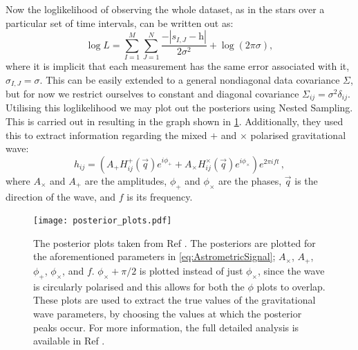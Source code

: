 Now the loglikelihood of observing the whole dataset, as in the stars over a particular set of time intervals, can be written out as:
%
\begin{equation}
    \log L = \sum^M_{I=1} \sum^N_{J=1} \frac{- | s_{I,J} - \mathbf{ \mathrm{h} }|}{2 \sigma^2}+\log (2\pi \sigma),
\end{equation}
%
where it is implicit that each measurement has the same error associated with it, $\sigma_{I,J}=\sigma$. This can be easily extended to a general nondiagonal data covariance $\Sigma$, but for now we restrict ourselves to constant and diagonal covariance $\Sigma_{ij}=\sigma^2 \delta_{ij}$. Utilising this loglikelihood we may plot out the posteriors using Nested Sampling. This is carried out in \cite{Mihaylov_2020} resulting in the graph shown in \cref{fig:lasenbyposteriors}. Additionally, they used this to extract information regarding the mixed $+$ and $\times$ polarised gravitational wave:
%
\begin{equation}\label{eq:AstrometricSignal} h_{ij}\!=\!\left(A_{+}H^{+}_{ij}(\vec{q})e^{i\phi_{+}}\!+\!A_{\times}H^{\times}_{ij}(\vec{q})e^{i\phi_{\times}}\right)e^{2\pi i f  t} \,, 
\end{equation} 
%
where $A_{\times}$ and $A_{+}$ are the amplitudes, $\phi_{+}$ and $\phi_{\times}$ are the phases, $\vec{q}$ is the direction of the wave, and $f$ is its frequency.



\begin{figure}
\centering    
\texttt{[image: posterior\_plots.pdf]}
\caption{\label{fig:epsart2} The posterior plots taken from Ref \cite{Mihaylov_2020}. The posteriors are plotted for the aforementioned parameters in \cref{eq:AstrometricSignal}; $A_{\times}$, $A_{+}$, $\phi_{+}$, $\phi_{\times}$, and $f$. $\phi_{\times}+\pi/2$ is plotted instead of just $\phi_{\times}$, since the wave is circularly polarised and this allows for both the $\phi$ plots to overlap. These plots are used to extract the true values of the gravitational wave parameters, by choosing the values at which the posterior peaks occur. For more information, the full detailed analysis is available in Ref \cite{Mihaylov_2020}.}
\label{fig:lasenbyposteriors}
\end{figure}



